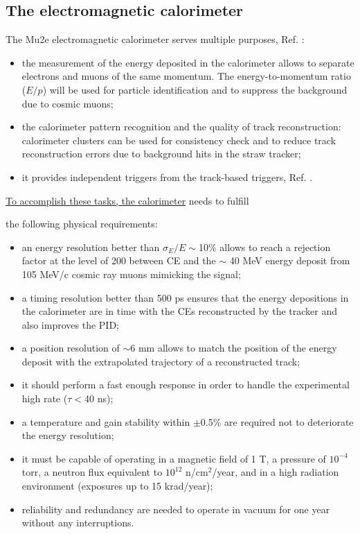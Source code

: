 \subsection{The electromagnetic calorimeter}\label{calorimeter}
The Mu2e electromagnetic calorimeter serves multiple purposes, Ref. \cite{em4}:
\begin{itemize}
    \item the measurement of the energy deposited in the calorimeter 
    allows to separate electrons and muons of the same momentum. 
    The energy-to-momentum ratio ($E/p$) will be used for particle 
    identification and to suppress the background due to cosmic muons;
  \item the calorimeter  
     pattern recognition and 
    the quality of  track reconstruction: {\red calorimeter clusters can be used 
      for consistency check}
    {\red and to reduce track reconstruction 
      errors due to background hits in the straw tracker;}
    \item it provides independent triggers from the track-based triggers, Ref. \cite{em6}. 
\end{itemize} 
\underline{\red To accomplish these tasks, the calorimeter} needs to fulfill

the following physical requirements:
\begin{itemize}
    \item an energy resolution better than $\sigma_E/E \sim$10\% allows
     to reach a rejection factor at the level of 200 between CE
    and the $\sim$ 40 MeV energy deposit from 105 MeV/c cosmic ray muons mimicking the signal;
    \item a timing resolution better than 500 ps ensures that
    the energy depositions in the calorimeter are in time with
    the CEs reconstructed by the tracker and
    also improves the PID;
    \item a position resolution of $\sim$6 mm allows 
    to match the position of the energy deposit with the 
    extrapolated trajectory of a reconstructed track;
    \item it should perform a fast enough 
      response in order to handle the experimental high rate ($\tau < 40$ ns);
    \item a temperature and gain stability within $\pm$0.5\% 
    are required not to deteriorate the energy resolution;
    \item it must be capable of operating in 
    a magnetic field of 1 T, a pressure of \(10^{-4}\) torr, a 
    neutron flux equivalent to \(10^{12}\) n/cm\(^2\)/year, 
    and in a high radiation environment (exposures up to 15 krad/year);
    \item reliability and redundancy are needed to operate in vacuum for one
    year without any interruptions.
\end{itemize}



